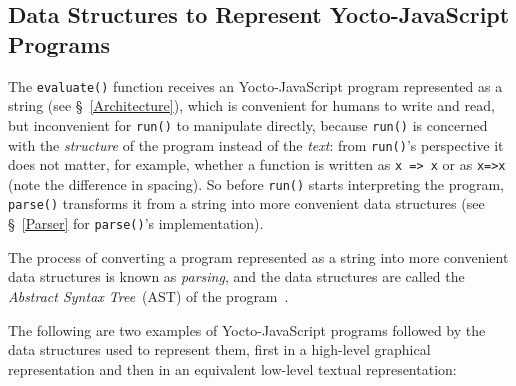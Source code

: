 \documentclass[12pt, oneside]{book}
\begin{document}
\subsection{Data Structures to Represent Yocto-JavaScript Programs}
\label{Data Structures to Represent Yocto-JavaScript Programs}

The \texttt{evaluate()} function receives an Yocto-JavaScript program represented as a string (see §~\ref{Architecture}), which is convenient for humans to write and read, but inconvenient for \texttt{run()} to manipulate directly, because \texttt{run()} is concerned with the \emph{structure} of the program instead of the \emph{text}: from \texttt{run()}’s perspective it does not matter, for example, whether a function is written as \texttt{x => x} or as \texttt{x=>x} (note the difference in spacing). So before \texttt{run()} starts interpreting the program, \texttt{parse()} transforms it from a string into more convenient data structures (see §~\ref{Parser} for \texttt{parse()}’s implementation).

\begin{mdframed}[frametitle = {Technical Terms}]
The process of converting a program represented as a string into more convenient data structures is known as \emph{parsing}, and the data structures are called the \emph{Abstract Syntax Tree}~(AST) of the program~\cite[§~4]{dragon-book}.
\end{mdframed}

The following are two examples of Yocto-JavaScript programs followed by the data structures used to represent them, first in a high-level graphical representation and then in an equivalent low-level textual representation:
\end{document}
